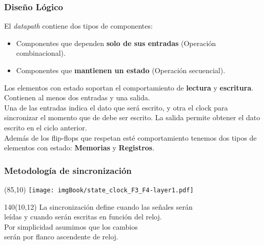 \documentclass[aspectratio=169]{beamer}
\begin{document}
\begin{frame}[t,fragile]
    \frametitle{Diseño Lógico}
    El \emph{datapath} contiene dos tipos de componentes:\\
    \begin{itemize}
     \item Componentes que dependen \textbf{solo de sus entradas} (Operación combinacional).
     \item Componentes que \textbf{mantienen un estado} (Operación secuencial).
    \end{itemize}
    \pause
    \bigskip
    Los elementos con estado soportan el comportamiento de \textbf{lectura} y \textbf{escritura}.\\
    Contienen al menos dos entradas y una salida.\\
    \pause
    \bigskip
    \textcolor{verdeuca}{
    Una de las entradas indica el dato que será escrito, y otra el clock para sincronizar el momento que de debe ser escrito.
    La salida permite obtener el dato escrito en el ciclo anterior.\\
    }
    \pause
    \bigskip
    Además de los flip-flops que respetan esté comportamiento tenemos dos tipos de elementos con estado: \textbf{Memorias} y \textbf{Registros}.\\
    \bigskip
\end{frame}
    
\begin{frame}[t,fragile]
    \frametitle{Metodología de sincronización}
    \begin{textblock}{10}(85,10)
    \texttt{[image: imgBook/state\_clock\_F3\_F4-layer1.pdf]}\\
    \vspace{3cm}
    \end{textblock}
    \begin{textblock}{140}(10,12)
    La sincronización define cuando las señales serán\\ leídas y cuando serán escritas en función del reloj.\\
    \bigskip
    \textcolor{verdeuca}{Por simplicidad asumimos que los cambios\\ serán por flanco ascendente de reloj.}\\
    \bigskip
    \vspace{0.8cm}
    \end{textblock}
\end{frame}
\end{document}
